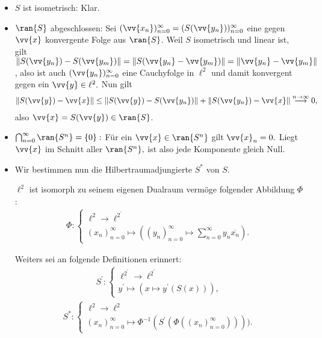 \begin{solution}

  \begin{itemize}
      \item $S$ ist isometrisch: Klar.
      \item $\ran{S}$ abgeschlossen: Sei $(\vv{x_n})_{n=0}^\infty =
      (S(\vv{y_n}))_{n=0}^\infty$ eine gegen $\vv{x}$ konvergente Folge aus $\ran{S}$. Weil $S$ isometrisch und linear ist, gilt
      $\| S(\vv{y_n}) - S(\vv{y_m})\|
      = \| S(\vv{y_n} - \vv{y_m}) \|
      = \| \vv{y_n} - \vv{y_m} \|$, also ist auch $(\vv{y_n})_{n=0}^\infty$ eine Cauchyfolge in $\ell^2$ und damit konvergent gegen ein $\vv{y} \in \ell^2.$ Nun gilt
      \begin{align}
       \| S(\vv{y}) - \vv{x} \| \leq
       \| S(\vv{y}) - S(\vv{y_n}) \| + \| S(\vv{y_n}) - \vv{x} \|
       \stackrel{n \rightarrow \infty}{\longrightarrow} 0,
      \end{align}
      also $\vv{x} = S(\vv{y}) \in \ran{S}$.
      \item $\bigcap_{n=0}^\infty \ran{S^n} = \{0\}:$ Für ein $\vv{x} \in \ran{S^n}$ gilt $\vv{x}_n = 0.$ Liegt $\vv{x}$ im Schnitt aller $\ran{S^n},$ ist also jede Komponente gleich Null.
      \item Wir bestimmen nun die Hilbertraumadjungierte $S^*$ von $S.$

      $\ell^2$ ist isomorph zu seinem eigenen Dualraum vermöge folgender Abbildung $\Phi$:
           \begin{align}
            \Phi: \left\{ \begin{array}{ll}
       \ell^2 \rightarrow \ell^2^\prime \\
      (x_n)_{n=0}^\infty \mapsto ((y_n)_{n=0}^\infty \mapsto \sum_{n=0}^\infty y_n \overline{x_n}).
        \end{array}
        \end{align}

      Weiters sei an folgende Definitionen erinnert:
      \begin{align}
        S^\prime: \left\{ \begin{array}{ll}
       \ell^2^\prime \rightarrow \ell^2^\prime \\
       y^\prime \mapsto (x \mapsto y^\prime(S(x))),
        \end{array}
        \end{align}
          \begin{align}
        S^*: \left\{\begin{array}{ll}
       \ell^2 \rightarrow \ell^2 \\
       (x_n)_{n=0}^\infty \mapsto \Phi^{-1}(S^\prime(\Phi((x_n)_{n=0}^\infty)))).
        \end{array}
      \end{align}


\end{itemize}
\end{solution}

